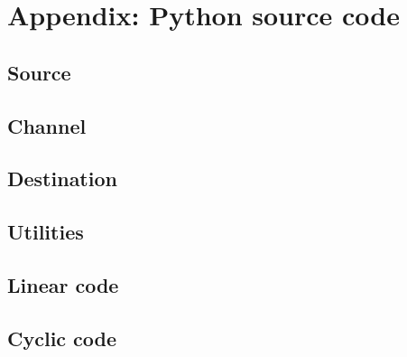 \documentclass{article}
\begin{document}
\newpage
\section{Appendix: Python source code}
\subsection{Source}
\label{appendix:source}


\subsection{Channel}
\label{appendix:channel}


\subsection{Destination}
\label{appendix:destination}


\subsection{Utilities}
\label{appendix:utils}




\subsection{Linear code}
\label{appendix:linear-code}


\subsection{Cyclic code}
\label{appendix:cyclic-code}

\end{document}
